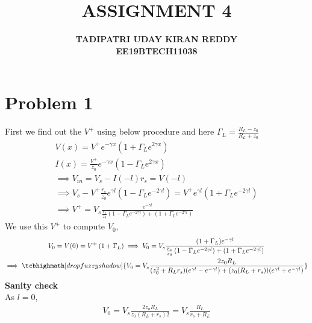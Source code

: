 \documentclass{article}
\begin{document}
\title{{\textbf{ASSIGNMENT 4}}}
\author{\textbf{TADIPATRI UDAY KIRAN REDDY}\\\textbf{EE19BTECH11038}}
\maketitle

\section*{\hfil Problem 1}
First we find out the $V^+$ using below procedure and here $\Gamma _L = \frac{R_L - z_0}{R_L + z_0}$
\begin{gather}
V(x) = V^+e^{-\gamma x}\left(1 + {\Gamma}_Le^{2\gamma x}\right) \\
I(x) = \frac{V^+}{z_0}e^{-\gamma x}\left(1 - {\Gamma}_Le^{2\gamma x}\right) \\
\implies V_{in} = V_{s} - I(-l)r_s = V(-l) \\
\implies V_{s} - V^+\frac{r_s}{z_0}e^{\gamma l}\left(1 - {\Gamma}_Le^{-2\gamma l}\right) = V^+e^{\gamma l}\left(1 + {\Gamma}_Le^{-2\gamma l}\right)\\
\implies V^+ = V_s\frac{e^{-\gamma l}}{\frac{r_s}{z_0}\left(1 - {\Gamma}_Le^{-2\gamma l}\right) + \left(1 + {\Gamma}_Le^{-2\gamma l}\right)}
\end{gather}
We use this $V^+$ to compute $V_0$,
\begin{gather}
V_0 = V(0) = V^+\left(1 + \Gamma _L\right)
\implies V_0 = V_s\frac{(1 + \Gamma _L) e^{-\gamma l}}{\frac{r_s}{z_0}\left(1 - {\Gamma}_Le^{-2\gamma l}\right) + \left(1 + {\Gamma}_Le^{-2\gamma l}\right)}\\
\implies \tcbhighmath[drop fuzzy shadow]{V_0 = V_s \frac{2z_0R_L}{(z_0^2+R_Lr_s)(e^{\gamma l}-e^{-\gamma l})+(z_0(R_L+r_s))(e^{\gamma l}+e^{-\gamma l})}}
\end{gather}
\textbf{Sanity check}\\
As $l = 0$,
\begin{gather}
V_0 = V_s\frac{2z_oR_L}{z_0(R_L + r_s)2} = V_s\frac{R_L}{r_s + R_L}
\end{gather}
\end{document}
